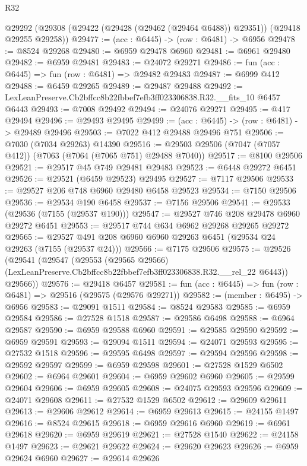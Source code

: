 \begin{lexlean}{R32}
\begin{coremodule}
  @29292 (@29308 (@29422 (@29428 (@29462 (@29464 @6488)) @29351)) (@29418 @29255 @29258))
@29477 := (acc : @6445) -> (row : @6481) -> @6956
@29478 := @8524 @29268
@29480 := @6959 @29478 @6960
@29481 := @6961 @29480
@29482 := @6959 @29481
@29483 := @24072 @29271
@29486 := fun (acc : @6445) => fun (row : @6481) => @29482 @29483
@29487 := @6999 @412
@29488 := @6459 @29265
@29489 := @29487 @29488
@29492 := LexLeanPreserve.Cb2bffcc8b22fbbef7efb3ff023306838.R32.__fits_10 @6457 @6443
@29493 := @7008 @29492
@29494 := @24076 @29271
@29495 := @417 @29494
@29496 := @29493 @29495
@29499 := (acc : @6445) -> (row : @6481) -> @29489 @29496
@29503 := @7022 @412 @29488 @29496 @751
@29506 := @7030 (@7034 @29263) @14390
@29516 := @29503 @29506 (@7047 (@7057 @412)) (@7063 (@7064 (@7065 @751) @29488 @7040))
@29517 := @8100 @29506
@29521 := @29517 @45 @749 @29481 @29483
@29523 := @6448 @29272 @6451
@29526 := @29521 (@6459 @29523) @29495
@29527 := @7117 @29506
@29533 := @29527 @206 @748 @6960 @29480 @6458 @29523
@29534 := @7150 @29506
@29536 := @29534 @190 @6458
@29537 := @7156 @29506
@29541 := @29533 (@29536 (@7155 (@29537 @190)))
@29547 := @29527 @746 @208 @29478 @6960 @29272 @6451
@29553 := @29517 @744 @634 @6962 @29268 @29265 @29272
@29565 := @29527 @491 @208 @6960 @6960 @29263 @6451 (@29534 @24 @29263 (@7155 (@29537 @24)))
@29566 := @7175 @29506
@29575 := @29526
    (@29541
      (@29547
        (@29553
          (@29565 @29566)
          (LexLeanPreserve.Cb2bffcc8b22fbbef7efb3ff023306838.R32.__rel_22 @6443))
        @29566))
@29576 := @29418 @6457
@29581 := fun (acc : @6445) => fun (row : @6481) => @29516 (@29575 (@29576 @29271))
@29582 := (member : @6495) -> @6956
@29583 := @29091 @1511
@29584 := @8524 @29583
@29585 := @6959 @29584
@29586 := @27528 @1518
@29587 := @29586 @6498
@29588 := @6964 @29587
@29590 := @6959 @29588 @6960
@29591 := @29585 @29590
@29592 := @6959 @29591
@29593 := @29094 @1511
@29594 := @24071 @29593
@29595 := @27532 @1518
@29596 := @29595 @6498
@29597 := @29594 @29596
@29598 := @29592 @29597
@29599 := @6959 @29598
@29601 := @27528 @1529 @6502
@29602 := @6964 @29601
@29604 := @6959 @29602 @6960
@29605 := @29599 @29604
@29606 := @6959 @29605
@29608 := @24075 @29593 @29596
@29609 := @24071 @29608
@29611 := @27532 @1529 @6502
@29612 := @29609 @29611
@29613 := @29606 @29612
@29614 := @6959 @29613
@29615 := @24155 @1497
@29616 := @8524 @29615
@29618 := @6959 @29616 @6960
@29619 := @6961 @29618
@29620 := @6959 @29619
@29621 := @27528 @1540
@29622 := @24158 @1497
@29623 := @29621 @29622
@29624 := @29620 @29623
@29626 := @6959 @29624 @6960
@29627 := @29614 @29626

\end{coremodule}
\end{lexlean}

